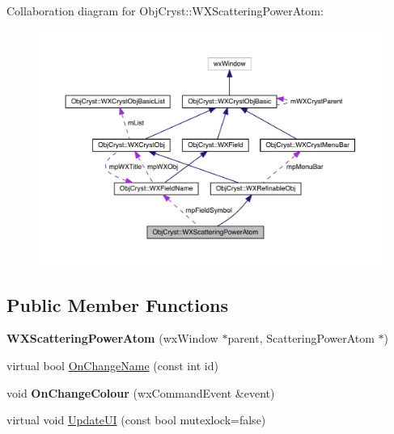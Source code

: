 Collaboration diagram for Obj\+Cryst\+::W\+X\+Scattering\+Power\+Atom\+:
\nopagebreak
\begin{figure}[H]
\begin{center}
\leavevmode
\includegraphics[width=350pt]{class_obj_cryst_1_1_w_x_scattering_power_atom__coll__graph}
\end{center}
\end{figure}
\subsection*{Public Member Functions}
\begin{DoxyCompactItemize}
\item 
\mbox{\label{class_obj_cryst_1_1_w_x_scattering_power_atom_a75350a1b1f3227bef2227b39dc5ecd60}} 
{\bfseries W\+X\+Scattering\+Power\+Atom} (wx\+Window $\ast$parent, Scattering\+Power\+Atom $\ast$)
\item 
virtual bool \mbox{\hyperlink{class_obj_cryst_1_1_w_x_scattering_power_atom_ac1b203e5de8d1827e6dba7f8715d1228}{On\+Change\+Name}} (const int id)
\item 
\mbox{\label{class_obj_cryst_1_1_w_x_scattering_power_atom_ae16457f5748ec8b73538dc4068885954}} 
void {\bfseries On\+Change\+Colour} (wx\+Command\+Event \&event)
\item 
virtual void \mbox{\hyperlink{class_obj_cryst_1_1_w_x_scattering_power_atom_abd8a32f23a0b29e45ae32e40f0fec212}{Update\+UI}} (const bool mutexlock=false)
\end{DoxyCompactItemize}
